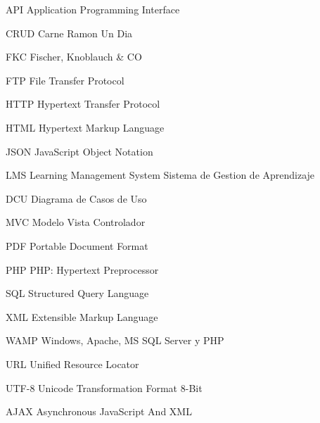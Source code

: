 	{API}
	{Application Programming Interface}

	{CRUD}
	{Carne Ramon Un Dia}

	{FKC}
	{Fischer, Knoblauch \& CO}

	{FTP}
	{File Transfer Protocol}

	{HTTP}
	{Hypertext Transfer Protocol}

	{HTML}
	{Hypertext Markup Language}

	{JSON}
	{JavaScript Object Notation}

	{LMS}
	{Learning Management System Sistema de Gestion de Aprendizaje}

	{DCU}
	{Diagrama de Casos de Uso}

	{MVC}
	{Modelo Vista Controlador}

	{PDF}
	{Portable Document Format}

	{PHP}
	{PHP: Hypertext Preprocessor}

	{SQL}
	{Structured Query Language}

	{XML}
	{Extensible Markup Language}

	{WAMP}
	{Windows, Apache, MS SQL Server y PHP}

	{URL}
	{Unified Resource Locator}

	{UTF-8}
	{Unicode Transformation Format 8-Bit}

	{AJAX}
	{Asynchronous JavaScript And XML}

